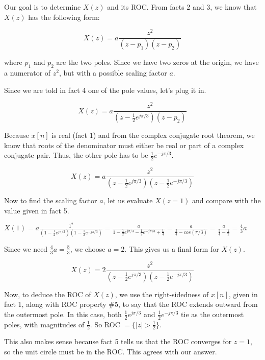 \documentclass[11pt]{article}
\begin{document}
{\color{blue}

Our goal is to determine $X(z)$ and its ROC. From facts 2 and 3, we know that $X(z)$ has the following form:

\begin{equation*}
X(z) = a \frac{z^2}{(z-p_1)(z-p_2)}
\end{equation*}

where $p_1$ and $p_2$ are the two poles. Since we have two zeros at the origin, we have a numerator of $z^2$, but with a possible scaling factor $a$.

Since we are told in fact 4 one of the pole values, let's plug it in.

\begin{equation*}
X(z) = a \frac{z^2}{(z-\frac{1}{2}e^{j \pi /3})(z-p_2)}
\end{equation*}

Because $x[n]$ is real (fact 1) and from the complex conjugate root theorem, we know that roots of the denominator must either be real or part of a complex conjugate pair. Thus, the other pole has to be $\frac{1}{2}e^{-j\pi/3}$.

\begin{equation*}
X(z) = a \frac{z^2}{(z-\frac{1}{2}e^{j \pi /3})(z-\frac{1}{2}e^{-j\pi/3})}
\end{equation*}

Now to find the scaling factor $a$, let us evaluate $X(z=1)$ and compare with the value given in fact 5.

$X(1) = a \frac{1^2}{(1-\frac{1}{2}e^{j \pi /3})(1-\frac{1}{2}e^{-j\pi/3})} = \frac{a}{1-\frac{1}{2}e^{j \pi /3}-\frac{1}{2}e^{-j \pi /3}+\frac{1}{4}} = \frac{a}{\frac{5}{4}-cos(\pi/3)} = \frac{a}{\frac{5}{4}-\frac{1}{2}}=\frac{4}{3}a$

Since we need $\frac{4}{3}a = \frac{8}{3}$, we choose $a=2$. This gives us a final form for $X(z)$.

\begin{equation*}
X(z) = 2 \frac{z^2}{(z-\frac{1}{2}e^{j \pi /3})(z-\frac{1}{2}e^{-j\pi/3})}
\end{equation*}

Now, to deduce the ROC of $X(z)$, we use the right-sidedness of $x[n]$, given in fact 1, along with ROC property \#5, to say that the ROC extends outward from the outermost pole. In this case, both $\frac{1}{2}e^{j \pi /3}$ and $\frac{1}{2}e^{-j \pi /3}$ tie as the outermost poles, with magnitudes of $\frac{1}{2}$. So ROC $=\{|z|>\frac{1}{2}\}$. 

This also makes sense because fact 5 tells us that the ROC converges for $z=1$, so the unit circle must be in the ROC. This agrees with our answer.
}
\end{document}

